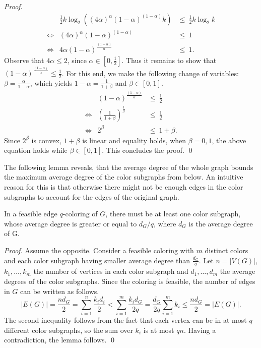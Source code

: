 \documentclass[runningheads, a4paper]{llncs}
\begin{document}
\begin{proof}
\begin{eqnarray}\nonumber
& \displaystyle\frac{1}{2} k \log_2 \left((4\alpha)^{\alpha}(1-\alpha)^{(1-\alpha)} k\right) & \leq \ \frac{1}{2} k\log_2 k \\ \nonumber
\Longleftrightarrow & (4\alpha)^\alpha(1-\alpha)^{(1-\alpha)} & \leq \ 1 \\ \nonumber
\Longleftrightarrow & 4\alpha (1-\alpha)^{\frac{(1-\alpha)}{\alpha}} & \leq \ 1.
\end{eqnarray}
Observe that $4\alpha \leq 2$, since $\alpha \in [0,\frac{1}{2}]$. Thus it remains to show that $(1-\alpha)^{\frac{(1-\alpha)}{\alpha}} \leq \frac{1}{2}$. For this end, we make the following change of variables: $\beta = \frac{\alpha}{1-\alpha}$, which yields $1 - \alpha = \frac{1}{1 + \beta}$ and $\beta \in [0,1]$.
\begin{eqnarray}\nonumber
& (1-\alpha)^{\frac{(1-\alpha)}{\alpha}} & \leq \ \frac{1}{2} \\ \nonumber
\Longleftrightarrow & \left(\displaystyle\frac{1}{1 + \beta}\right)^{\frac{1}{\beta}} & \leq \ \frac{1}{2} \\ \nonumber
\Longleftrightarrow & 2^{\beta} & \leq \ 1 + \beta.
\end{eqnarray}
Since $2^{\beta}$ is convex, $1 + \beta$ is linear and equality holds, when $\beta = 0,1$, the above equation holds while $\beta \in [0,1]$. This concludes the proof. \qed
\end{proof}

The following lemma reveals, that the average degree of the whole graph bounds the maximum average degree of the color subgraphs from below. An intuitive reason for this is that otherwise there might not be enough edges in the color subgraphs to account for the edges of the original graph.

\begin{lemma}\label{lemma:hypercube2}
In a feasible edge $q$-coloring of $G$, there must be at least one color subgraph, whose average degree is greater or equal to $d_G/q$, where $d_G$ is the average degree of G.
\end{lemma}
\begin{proof}
Assume the opposite. Consider a feasible coloring with $m$ distinct colors and each color subgraph having smaller average degree than $\frac{d_G}{q}$. Let $n = |V(G)|$, $k_1, \ldots, k_m$ the number of vertices in each color subgraph and $d_1, \ldots, d_m$ the average degrees of the color subgraphs. Since the coloring is feasible, the number of edges in $G$ can be written as follows.
\begin{displaymath}
|E(G)| = \frac{nd_G}{2} = \sum_{i=1}^n \frac{k_id_i}{2} < \sum_{i=1}^m \frac{k_id_G}{2q} = \frac{d_G}{2q} \sum_{i=1}^m k_i \leq \frac{nd_G}{2} = |E(G)|.
\end{displaymath}
The second inequality follows from the fact that each vertex can be in at most $q$ different color subgraphs, so the sum over $k_i$ is at most $qn$. Having a contradiction, the lemma follows. \qed
\end{proof}
\end{document}
